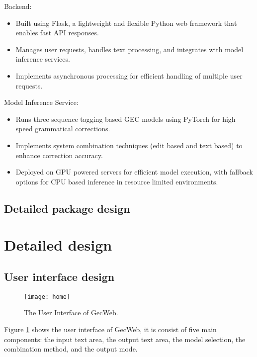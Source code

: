 Backend:

\begin{itemize}
  \item Built using Flask, a lightweight and flexible Python web framework that enables fast API responses.
  \item Manages user requests, handles text processing, and integrates with model inference services.
  \item Implements asynchronous processing for efficient handling of multiple user requests.
\end{itemize}

Model Inference Service:

\begin{itemize}
  \item Runs three sequence tagging based GEC models using PyTorch for high speed grammatical corrections.
  \item Implements system combination techniques (edit based and text based) to enhance correction accuracy.
  \item Deployed on GPU powered servers for efficient model execution, with fallback options for CPU based inference in resource limited environments.
\end{itemize}

\subsection{Detailed package design}

\section{Detailed design}

\subsection{User interface design}

\begin{figure}[htbp]
  \begin{center}
    \texttt{[image: home]}
  \end{center}
  \caption{The User Interface of GecWeb.}\label{fig:home}
\end{figure}

Figure \ref{fig:home} shows the user interface of GecWeb, it is consist of five main components: the input text area, the output text area, the model selection, the combination method, and the output mode.

